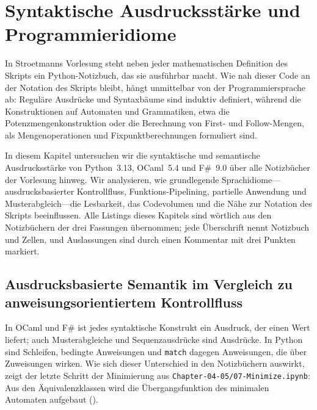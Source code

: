 \chapter{Syntaktische Ausdrucksstärke und Programmieridiome}
\label{chap:expressiveness}

In Stroetmanns Vorlesung steht neben jeder mathematischen Definition des Skripts ein Python-Notizbuch, das sie ausführbar macht.
Wie nah dieser Code an der Notation des Skripts bleibt, hängt unmittelbar von der Programmiersprache ab: Reguläre Ausdrücke und Syntaxbäume sind induktiv definiert, während die Konstruktionen auf Automaten und Grammatiken, etwa die Potenzmengenkonstruktion oder die Berechnung von First- und Follow-Mengen, als Mengenoperationen und Fixpunktberechnungen formuliert sind.

In diesem Kapitel untersuchen wir die syntaktische und semantische Ausdrucksstärke von Python~3.13, OCaml~5.4 und F\#~9.0 über alle Notizbücher der Vorlesung hinweg.
Wir analysieren, wie grundlegende Sprachidiome---ausdrucksbasierter Kontrollfluss, Funktions-Pipelining, partielle Anwendung und Musterabgleich---die Lesbarkeit, das Codevolumen und die Nähe zur Notation des Skripts beeinflussen.
Alle Listings dieses Kapitels sind wörtlich aus den Notizbüchern der drei Fassungen übernommen; jede Überschrift nennt Notizbuch und Zellen, und Auslassungen sind durch einen Kommentar mit drei Punkten markiert.

\section{Ausdrucksbasierte Semantik im Vergleich zu anweisungsorientiertem Kontrollfluss}
\label{sec:expression_semantics}

In OCaml und F\# ist jedes syntaktische Konstrukt ein Ausdruck, der einen Wert liefert; auch Musterabgleiche und Sequenzausdrücke sind Ausdrücke.
In Python sind Schleifen, bedingte Anweisungen und \texttt{match} dagegen Anweisungen, die über Zuweisungen wirken.
Wie sich dieser Unterschied in den Notizbüchern auswirkt, zeigt der letzte Schritt der Minimierung aus \texttt{Chapter-04-05/07-Minimize.ipynb}: Aus den Äquivalenzklassen wird die Übergangsfunktion des minimalen Automaten aufgebaut ().

